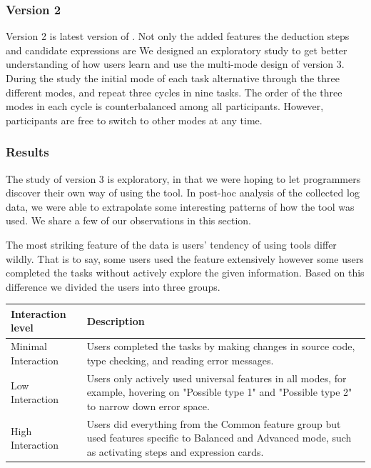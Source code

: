 \subsubsection{\textbf{Version 2}}  \label{sub:us4}

Version 2 is latest version of \chameleon{}. Not only the added features the deduction steps and candidate expressions are We designed an exploratory study to get better understanding of how users learn and use the multi-mode design of \chameleon{} version 3. During the study the initial mode of each task alternative through the three different modes, and repeat three cycles in nine tasks. The order of the three modes in each cycle is counterbalanced among all participants. However, participants are free to switch to other modes at any time. 



\subsubsection*{\textbf{Results}} 

The study of version 3 \chameleon{} is exploratory, in that we were hoping to let programmers discover their own way of using the tool. In post-hoc analysis of the collected log data, we were able to extrapolate some interesting patterns of how the tool was used. We share a few of our observations in this section.


The most striking feature of the data is users' tendency of using tools differ wildly. That is to say, some users used the feature extensively however some users completed the tasks without actively explore the given information. Based on this difference we divided the users into three groups.

\begin{tabularx}{\linewidth}{ 
  | >{\raggedright\arraybackslash}X 
  | >{\raggedright\arraybackslash}X  | }

    \hline
        Interaction level & Description \\ \hline
        Minimal Interaction & Users completed the tasks by making changes in source code, type checking, and reading error messages. \\ \hline
        Low Interaction & Users only actively used universal features in all modes, for example, hovering on "Possible type 1" and "Possible type 2" to narrow down error space. \\ \hline
        High Interaction & Users did everything from the Common feature group but used features specific to Balanced and Advanced mode, such as activating steps and expression cards. \\ \hline

\end{tabularx}



